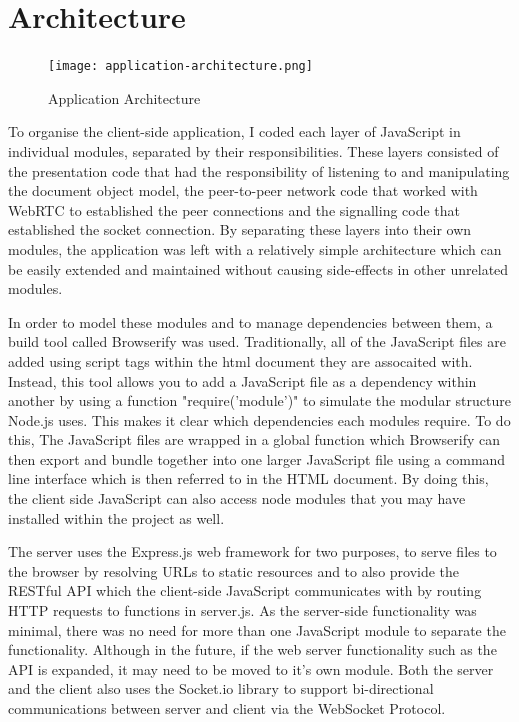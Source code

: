\documentclass[]{report}
\begin{document}
		\section{Architecture}
			\begin{figure}[H]
				\caption{Application Architecture}
				\centering
				\texttt{[image: application-architecture.png]}
			\end{figure}
			To organise the client-side application, I coded each layer of JavaScript in individual modules, separated by their responsibilities. These layers consisted of the presentation code that had the responsibility of listening to and manipulating the document object model, the peer-to-peer network code that worked with WebRTC to established the peer connections and the signalling code that established the socket connection. By separating these layers into their own modules, the application was left with a relatively simple architecture which can be easily extended and maintained without causing side-effects in other unrelated modules.
			
			In order to model these modules and to manage dependencies between them, a build tool called Browserify was used. Traditionally, all of the JavaScript files are added using script tags within the html document they are assocaited with. Instead, this tool allows you to add a JavaScript file as a dependency within another by using a function "require('module')" to simulate the modular structure Node.js uses. This makes it clear which dependencies each modules require. To do this, The JavaScript files are wrapped in a global function which Browserify can then export and bundle together into one larger JavaScript file using a command line interface which is then referred to in the HTML document. By doing this, the client side JavaScript can also access node modules that you may have installed within the project as well.
			
			The server uses the Express.js web framework for two purposes, to serve files to the browser by resolving URLs to static resources and to also provide the RESTful API which the client-side JavaScript communicates with by routing HTTP requests to functions in server.js. As the server-side functionality was minimal, there was no need for more than one JavaScript module to separate the functionality. Although in the future, if the web server functionality such as the API is expanded, it may need to be moved to it's own module. Both the server and the client also uses the Socket.io library to support bi-directional communications between server and client via the WebSocket Protocol. 
			
\end{document}
